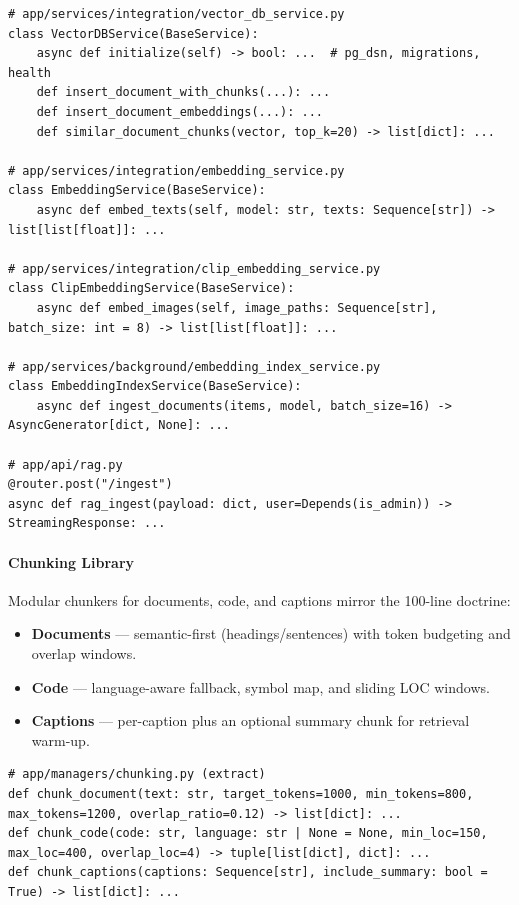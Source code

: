 \documentclass[11pt]{article}
\begin{document}
\begin{lstlisting}[style=python]
# app/services/integration/vector_db_service.py
class VectorDBService(BaseService):
    async def initialize(self) -> bool: ...  # pg_dsn, migrations, health
    def insert_document_with_chunks(...): ...
    def insert_document_embeddings(...): ...
    def similar_document_chunks(vector, top_k=20) -> list[dict]: ...

# app/services/integration/embedding_service.py
class EmbeddingService(BaseService):
    async def embed_texts(self, model: str, texts: Sequence[str]) -> list[list[float]]: ...

# app/services/integration/clip_embedding_service.py
class ClipEmbeddingService(BaseService):
    async def embed_images(self, image_paths: Sequence[str], batch_size: int = 8) -> list[list[float]]: ...

# app/services/background/embedding_index_service.py
class EmbeddingIndexService(BaseService):
    async def ingest_documents(items, model, batch_size=16) -> AsyncGenerator[dict, None]: ...

# app/api/rag.py
@router.post("/ingest")
async def rag_ingest(payload: dict, user=Depends(is_admin)) -> StreamingResponse: ...
\end{lstlisting}

\paragraph{Chunking Library}
Modular chunkers for documents, code, and captions mirror the 100-line doctrine:

\begin{itemize}
  \item \textbf{Documents} — semantic-first (headings/sentences) with token budgeting and overlap windows.
  \item \textbf{Code} — language-aware fallback, symbol map, and sliding LOC windows.
  \item \textbf{Captions} — per-caption plus an optional summary chunk for retrieval warm-up.
\end{itemize}

\begin{lstlisting}[style=python]
# app/managers/chunking.py (extract)
def chunk_document(text: str, target_tokens=1000, min_tokens=800, max_tokens=1200, overlap_ratio=0.12) -> list[dict]: ...
def chunk_code(code: str, language: str | None = None, min_loc=150, max_loc=400, overlap_loc=4) -> tuple[list[dict], dict]: ...
def chunk_captions(captions: Sequence[str], include_summary: bool = True) -> list[dict]: ...
\end{lstlisting}
\end{document}
